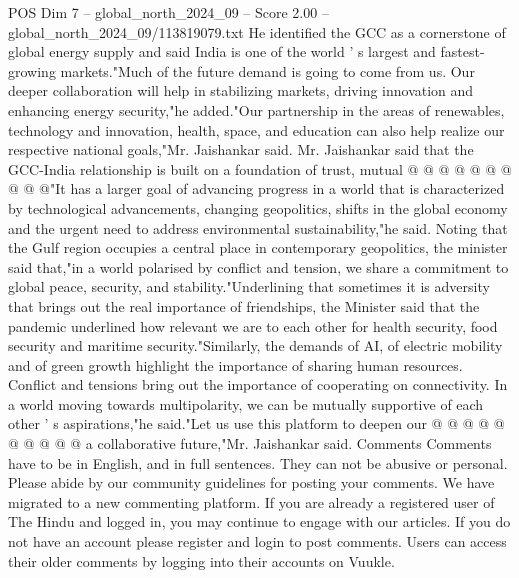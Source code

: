 \begin{textsample}{POS Dim 7 – global\_north\_2024\_09 – Score 2.00 – global\_north\_2024\_09/113819079.txt}
He identified the GCC as a cornerstone of global energy supply and said India is one of the world ' s largest and fastest-growing markets."Much of the future demand is going to come from us.
Our deeper collaboration will help in stabilizing markets, driving innovation and enhancing energy security,"he added."Our partnership in the areas of renewables, technology and innovation, health, space, and education can also help realize our respective national goals,"Mr.
Jaishankar said.
Mr.
Jaishankar said that the GCC-India relationship is built on a foundation of trust, mutual @ @ @ @ @ @ @ @ @ @"It has a larger goal of advancing progress in a world that is characterized by technological advancements, changing geopolitics, shifts in the global economy and the urgent need to address environmental sustainability,"he said.
Noting that the Gulf region occupies a central place in contemporary geopolitics, the minister said that,"in a world polarised by conflict and tension, we share a commitment to global peace, security, and stability."Underlining that sometimes it is adversity that brings out the real importance of friendships, the Minister said that the pandemic underlined how relevant we are to each other for health security, food security and maritime security."Similarly, the demands of AI, of electric mobility and of green growth highlight the importance of sharing human resources.
Conflict and tensions bring out the importance of cooperating on connectivity.
In a world moving towards multipolarity, we can be mutually supportive of each other ' s aspirations,"he said."Let us use this platform to deepen our @ @ @ @ @ @ @ @ @ @ a collaborative future,"Mr.
Jaishankar said.
Comments Comments have to be in English, and in full sentences.
They can not be abusive or personal.
Please abide by our community guidelines for posting your comments.
We have migrated to a new commenting platform.
If you are already a registered user of The Hindu and logged in, you may continue to engage with our articles.
If you do not have an account please register and login to post comments.
Users can access their older comments by logging into their accounts on Vuukle.

\end{textsample}
